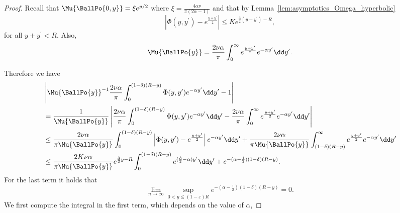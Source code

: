 \begin{proof}
Recall that $\Mu{\BallPo{0,y}} = \xi e^{y/2}$ where $\xi = \frac{4\alpha\nu}{\pi(2\alpha - 1)}$ and that by Lemma~\ref{lem:asymptotics_Omega_hyperbolic}
\[
	\left|\Phi(y,y^\prime) - e^{\frac{y+y^\prime}{2}}\right| \le K e^{\frac{3}{2}(y+y^\prime) - R},
\]
for all $y + y^\prime < R$. Also,
\[
	\Mu{\BallPo{y}} = \frac{2 \nu \alpha}{\pi}\int_0^\infty e^{\frac{y + y^\prime}{2}} e^{-\alpha y^\prime} \dd y^\prime. 
\]

Therefore we have 
\begin{align*}
	&\left|\Mu{\BallPo{y}}^{-1} \frac{2\nu \alpha}{\pi} \int_0^{(1-\delta)(R-y)} \Phi(y,y^\prime) e^{-\alpha y^\prime} 
		\dd y^\prime  - 1\right|\\
	&= \frac{1}{\Mu{\BallPo{y}}}\left|\frac{2\nu \alpha}{\pi} \int_0^{(1-\delta)(R-y)} \Phi(y,y^\prime) 
		e^{-\alpha y^\prime} \dd y^\prime 
		- \frac{2\nu \alpha}{\pi} \int_0^\infty e^{\frac{y + y^\prime}{2}} e^{-\alpha y^\prime} \dd y^\prime\right|\\
	&\le \frac{2\nu \alpha}{\pi \Mu{\BallPo{y}}} \int_0^{(1-\delta)(R-y)}\left|\Phi(y,y^\prime) - 
		e^{\frac{y + y^\prime}{2}} \right| e^{-\alpha y^\prime} \dd y^\prime
		+ \frac{2\nu \alpha}{\pi \Mu{\BallPo{y}}} \int_{(1-\delta)(R-y)}^\infty e^{\frac{y + y^\prime}{2}} 
		e^{-\alpha y^\prime} \dd y^\prime\\
	&\le \frac{2 K \nu \alpha}{\pi \Mu{\BallPo{y}}} e^{\frac{3}{2}y - R} \int_0^{(1-\delta)(R-y)} 	
		e^{(\frac{3}{2}-\alpha)y^\prime} \dd y^\prime +  e^{-(\alpha-\frac{1}{2})(1-\delta)(R-y)}.
\end{align*}
For the last term it holds that
\[
	\lim_{n \to \infty} \sup_{0 < y \le (1-\varepsilon)R}  e^{-(\alpha-\frac{1}{2})(1-\delta)(R-y)} = 0.
\]
We first compute the integral in the first term, which depends on the value of $\alpha$,

\end{proof}
